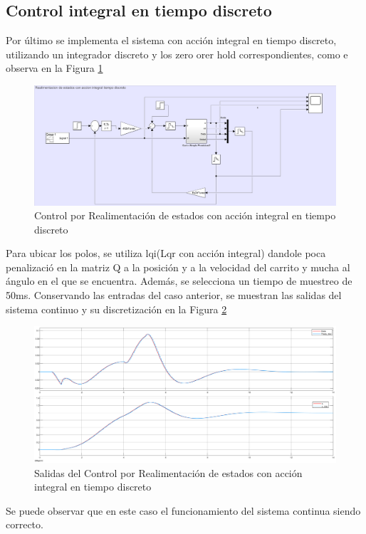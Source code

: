 \subsection{Control integral en tiempo discreto}
Por \'ultimo se implementa el sistema con acci\'on integral en tiempo discreto, utilizando un integrador discreto y los zero orer hold correspondientes, como e observa en la Figura \ref{fig:discreteIntegralFeed}
\begin{figure}[H]
	\centering
	\includegraphics[width=0.8\linewidth]{ImagenesRealimentacióndeEstados/discreteIntegralFeed}
	\caption{Control por Realimentaci\'on de estados con acci\'on integral en tiempo discreto}	
	\label{fig:discreteIntegralFeed}
\end{figure}
Para ubicar los polos, se utiliza lqi(Lqr con acci\'on integral) dandole poca penalizaci\'o en la matriz Q a la posici\'on y a la velocidad del carrito y mucha al \'angulo en el que se encuentra. Adem\'as, se selecciona un tiempo de muestreo de 50ms. 
Conservando las entradas del caso anterior, se muestran las salidas del sistema continuo y su discretizaci\'on en la Figura \ref{fig:discreteIntegralFeedOut}
\begin{figure}[H]
	\centering
	\includegraphics[width=0.8\linewidth]{ImagenesRealimentacióndeEstados/discreteIntegralFeedOut}
	\caption{Salidas del Control por Realimentaci\'on de estados con acci\'on integral en tiempo discreto}	
	\label{fig:discreteIntegralFeedOut}
\end{figure}
Se puede observar que en este caso el funcionamiento del sistema continua siendo correcto.
%